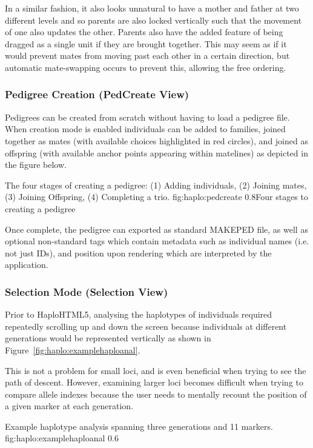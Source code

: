 In a similar fashion, it also looks unnatural to have a mother and father at two different levels and so  parents are also locked vertically such that the movement of one also updates the other. Parents also have the added feature of being dragged as a single unit if they are brought together. This may seem as if it would prevent mates from moving past each other in a certain direction, but automatic mate-swapping occurs to prevent this, allowing the free ordering.

\subsubsection{Pedigree Creation (PedCreate View)}

Pedigrees can be created from scratch without having to load a pedigree file. When creation mode is  enabled individuals can be added to families, joined together as mates (with available choices highlighted in red circles), and joined as offspring (with available anchor points appearing within matelines) as depicted in the figure below.

	{The four stages of creating a pedigree: (1) Adding individuals, (2) Joining mates, (3) Joining Offspring, (4) Completing a trio.}
	{fig:haplo:pedcreate}
	{0.8}{Four stages to creating a pedigree}
	
Once complete, the pedigree can exported as standard MAKEPED file, as well as optional non-standard tags which contain metadata such as individual names (i.e. not just IDs), and position upon rendering which are interpreted by the application.

\subsubsection{Selection Mode (Selection View)}

Prior to HaploHTML5, analysing the haplotypes of individuals required repeatedly scrolling up and down the screen because individuals at different generations would be represented vertically as shown in Figure~\ref{fig:haplo:examplehaploanal}.

This is not a problem for small loci, and is even beneficial when trying to see the path of descent. However, examining larger loci becomes difficult when trying to compare allele indexes because the user needs to mentally recount the position of a given marker at each generation.

	{Example haplotype analysis spanning three generations and 11 markers.}
	{fig:haplo:examplehaploanal}
	{0.6}{}



